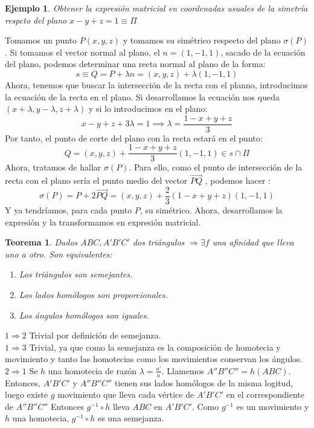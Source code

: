 \documentclass[11pt, a4paper, titlepage]{article}
\makeatletter
\renewenvironment{proof}[1][\proofname] {\vspace{-15pt}\par\pushQED{\qed}\normalfont\topsep6\p@\@plus6\p@\relax\trivlist\item[\hskip\labelsep\it#1\@addpunct{.}]\ignorespaces}{\popQED\endtrivlist\@endpefalse}
\renewcommand{\vec}{\overrightarrow}
\theoremstyle{theorem-style}
\newtheorem*{nth}{Teorema}
\theoremstyle{definition-style}
\theoremstyle{remark-style}
\theoremstyle{example-style}
\newtheorem*{ejemplo}{Ejemplo}
\makeatother
\begin{document}
\begin{ejemplo}
  Obtener la expresión matricial en coordenadas usuales de la simetría respcto del plano $x-y+z = 1\equiv \Pi$
\end{ejemplo}
\begin{proof}[Solución:]
  Tomamos un punto $P(x,y,z)$ y tomamos su simétrico respecto del plano $\sigma(P)$. Si tomamos el vector normal al plano, el $n=(1,-1,1)$, sacado de la ecuación del plano, podemos determinar una recta normal al plano de la forma:
  \[
    s\equiv Q = P + \lambda n = (x,y,z)+\lambda(1,-1,1)
  \]
  Ahora, tenemos que buscar la intersección de la recta con el planno, introducimos la ecuación de la recta en el plano. Si desarrollamos la ecuación nos queda $(x+\lambda,y-\lambda,z+\lambda)$ y si lo introducimos en el plano:
  \[
    x-y+z+3\lambda = 1 \implies \lambda = \frac{1-x+y+z}{3}
  \]
  Por tanto, el punto de corte del plano con la recta estará en el punto:
  \[
    Q = (x,y,z)+\frac{1-x+y+z}{3}(1,-1,1) \in s\cap \Pi
  \]
  Ahora, tratamos de hallar $\sigma(P)$. Para ello, como el punto de intersección de la recta con el plano sería el punto medio del vector $\vec{PQ}$ , podemos hacer :
  \[
    \sigma(P) = P + 2 \vec{PQ} = (x,y,z) + \dfrac{2}{3}(1-x+y+z)(1,-1,1)
  \]
  Y ya tendríamos, para cada punto $P$, su simétrico. Ahora, desarrollamos la expresión y la transformamos en expresión matricial.
\end{proof}

\begin{nth}
  Dados $ABC, A'B'C'$ dos triángulos $\Rightarrow \exists f$ una afinidad que lleva uno a otro. Son equivalentes:
  \begin{enumerate}
  \item Los triángulos son semejantes.
  \item Los lados homólogos son proporcionales.
  \item Los ángulos homólogos son iguales.
  \end{enumerate}	
\end{nth}

\begin{proof} \hfill 

  $\boxed{1 \Rightarrow 2}$ Trivial por definición de semejanza.\\
  $\boxed{1 \Rightarrow 3}$ Trivial, ya que como la semejanza es la composición de homotecia y movimiento y tanto las homotecias como los movimientos conservan los ángulos.\\
  $\boxed{2 \Rightarrow 1}$ Se $h$ una homotecia de razón $\lambda = \frac{a'}{a}$. Llamemos $A''B''C'' = h(ABC)$. Entonces, $A'B'C'$ y $A''B''C''$ tienen sus lados homólogos de la misma logitud, luego existe $g$ movimiento que lleva cada vértice de $A'B'C'$ en el correspondiente de $A''B''C''$ Entonces $g^{-1} \circ h$ lleva $ABC$ en $	A'B'C'$. Como $g^{-1}$ es un movimiento y $h$ una homotecia, $g^{-1} \circ h$ es una semejanza.
\end{proof}
\end{document}
